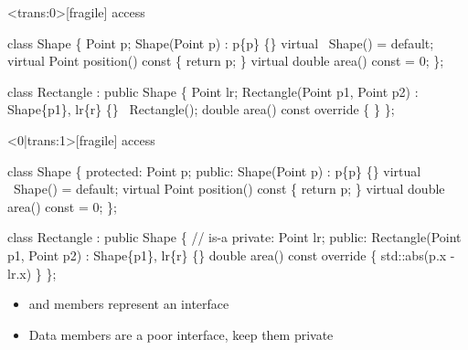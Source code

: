 \begin{frame}<trans:0>[fragile]{ access}
  \begin{codeblock}
class Shape \{
  Point p;
  Shape(Point p) : p\{p\} \{\}
  virtual ~Shape() = default;
  virtual Point \alert<6>{position}() const \{ return p; \}
  virtual double area() const = 0;
\};

class Rectangle : \alert<1>{public} Shape \{
  Point lr;
  Rectangle(Point p1, Point p2) : Shape\{p1\}, lr\{r\} \{\}
  ~Rectangle();
  double area() const override \{ \ddd {} \ddd \}
\};\end{codeblock}


\end{frame}

\begin{frame}<0|trans:1>[fragile]{ access}
  \begin{codeblock}{
class Shape \{
 \alert{protected}:
  Point p;
 public:
  Shape(Point p) : p\{p\} \{\}
  virtual ~Shape() = default;
  virtual Point position() const \{ return p; \}
  virtual double area() const = 0;
\};

class Rectangle : public Shape \{ // is-a
 private:
  Point lr;
 public:
  Rectangle(Point p1, Point p2) : Shape\{p1\}, lr\{r\} \{\}
  double area() const override \{ \ddd std::abs(\alert{p}.x - lr.x) \ddd \}
\};
}\end{codeblock}

  \begin{itemize}[<8->]
  \item {} and  members represent an interface
  \item Data members are a poor interface, keep them private
  \end{itemize}

\end{frame}

